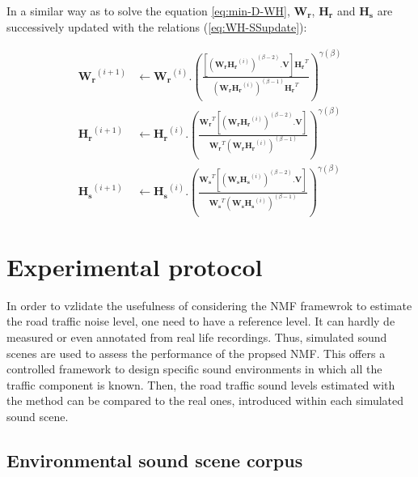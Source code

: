 \documentclass[twocolumn,a4paper,10pt]{article}
\begin{document}
In a similar way as to solve the equation \ref{eq:min-D-WH}, $\mathbf{W_r}$, $\mathbf{H_r}$ and $\mathbf{H_s}$ are successively updated with the relations (\ref{eq:WH-SSupdate}):

{\scriptsize
\begin{subequations}\label{eq:WH-SSupdate}
\begin{align}
\mathbf{W_r}^{(i+1)} &\leftarrow \mathbf{W_r}^{(i)}.\left(\frac{\left[\left(\mathbf{W_r H_r}^{(i)} \right)^{(\beta-2)}.\mathbf{V} \right]\mathbf{H_r}^T}{\left(\mathbf{W_r H_r}^{(i)} \right)^{(\beta-1)}\mathbf{H_r}^T}\right)^{\gamma(\beta)}\label{eq:W_r_SS}\\
\mathbf{H_r}^{(i+1)} &\leftarrow \mathbf{H_r}^{(i)}.\left(\frac{\mathbf{W_r}^T \left[\left(\mathbf{W_r H_r}^{(i)} \right)^{(\beta-2)}.\mathbf{V} \right]}{\mathbf{W_r}^T \left(\mathbf{W_r H_r}^{(i)} \right)^{(\beta-1)}}\right)^{\gamma(\beta)}\label{eq:H_r_SS}\\
\mathbf{H_s}^{(i+1)} &\leftarrow \mathbf{H_s}^{(i)}.\left(\frac{\mathbf{W_s}^T \left[\left(\mathbf{W_s H_s}^{(i)} \right)^{(\beta-2)}.\mathbf{V} \right]}{\mathbf{W_s}^T \left(\mathbf{W_s H_s}^{(i)} \right)^{(\beta-1)}}\right)^{\gamma(\beta)}\label{eq:H_s_SS}
\end{align}
\end{subequations}}


\section{Experimental protocol}\label{part:protocol}

In order to vzlidate the usefulness of considering the NMF framewrok to estimate the road traffic noise level, one need to have a reference level. It can hardly de measured or even annotated from real life recordings. Thus,  simulated sound scenes are used to assess the performance of the propsed NMF. This offers a controlled framework to design specific sound environments in which all the traffic component is known. Then, the road traffic sound levels estimated with the method can be compared to the real ones, introduced within each simulated sound scene.

\subsection{Environmental sound scene corpus}
\end{document}
